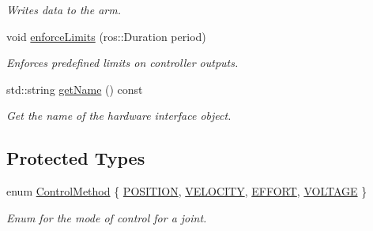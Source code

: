 \begin{DoxyCompactItemize}
\begin{DoxyCompactList}\small\item\em Writes data to the arm. \end{DoxyCompactList}\item 
void \hyperlink{classuwrt_1_1arm_1_1_arm_h_w_aef2643b05e4070ab7142eca2be62ddd1}{enforce\+Limits} (ros\+::\+Duration period)
\begin{DoxyCompactList}\small\item\em Enforces predefined limits on controller outputs. \end{DoxyCompactList}\item 
std\+::string \hyperlink{classuwrt_1_1arm_1_1_arm_h_w_a2ded1550eac19e0ea4ac4830fe196ad5}{get\+Name} () const
\begin{DoxyCompactList}\small\item\em Get the name of the hardware interface object. \end{DoxyCompactList}\end{DoxyCompactItemize}
\subsection*{Protected Types}
\begin{DoxyCompactItemize}
\item 
enum \hyperlink{classuwrt_1_1arm_1_1_arm_h_w_aef42f10e04f7f426b3d06f91d0897b6b}{Control\+Method} \{ \hyperlink{classuwrt_1_1arm_1_1_arm_h_w_aef42f10e04f7f426b3d06f91d0897b6ba7e141378d3029e25ce86b40cc794e8d6}{P\+O\+S\+I\+T\+I\+ON}, 
\hyperlink{classuwrt_1_1arm_1_1_arm_h_w_aef42f10e04f7f426b3d06f91d0897b6ba143f6d42adf4ed0f7b4f776bac5fc645}{V\+E\+L\+O\+C\+I\+TY}, 
\hyperlink{classuwrt_1_1arm_1_1_arm_h_w_aef42f10e04f7f426b3d06f91d0897b6ba5de839ecc8d975a1ebb795e0439e1904}{E\+F\+F\+O\+RT}, 
\hyperlink{classuwrt_1_1arm_1_1_arm_h_w_aef42f10e04f7f426b3d06f91d0897b6ba0ba2d8d7f2e958362c284ffbcf7a686f}{V\+O\+L\+T\+A\+GE}
 \}\begin{DoxyCompactList}\small\item\em Enum for the mode of control for a joint. \end{DoxyCompactList}
\end{DoxyCompactItemize}
